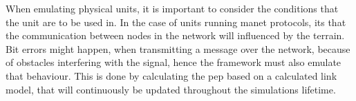 When emulating physical units, it is important to consider the conditions that the unit are to be used in. In the case of units running \gls{manet} protocols, its that the communication between nodes in the network will influenced by the terrain. Bit errors might happen, when transmitting a message over the network, because of obstacles interfering with the signal, hence the framework must also emulate that behaviour. This is done by calculating the \gls{pep} based on a calculated link model, that will continuously be updated throughout the simulations lifetime.





%
%
%
%
%
